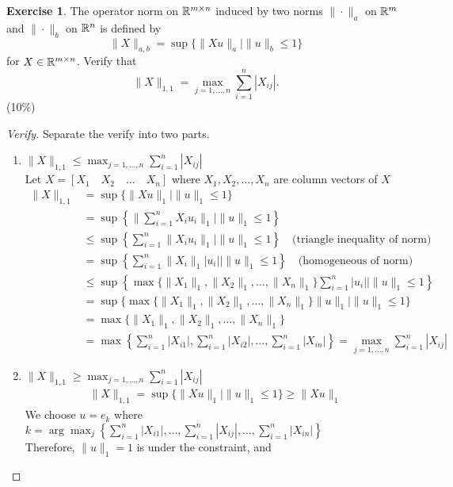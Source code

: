 \documentclass[12pt]{extarticle}
\theoremstyle{definition}
\newtheorem{exercise}{Exercise}
\begin{document}
\begin{exercise}
  The operator norm on $\mathbb{R}^{m\times n}$ induced by two norms $\|\cdot\|_a$ on $\mathbb{R}^m$ and $\|\cdot\|_b$ on $\mathbb{R}^n$ is defined by
  $$\|X\|_{a,b}=\sup\{\|Xu\|_a\mid\|u\|_b\le 1\}$$
  for $X\in\mathbb{R}^{m\times n}$. Verify that
  $$\|X\|_{1,1}=\max_{j=1,\dots,n}\sum_{i=1}^n|X_{ij}|.$$ (10\%)
\end{exercise}
\newpage
\begin{proof}[Verify]
  Separate the verify into two parts.
  \begin{enumerate}[label=(\alph*)]
    \item $\|X\|_{1,1}\le\max_{j=1,\dots,n}\sum_{i=1}^n|X_{ij}|$\\
      Let $X=[X_1\quad X_2\quad\dots\quad X_n]$ where $X_1,X_2,\dots,X_n$ are column vectors of $X$
      \begin{align*}
        \|X\|_{1,1} &=   \sup\{\|Xu\|_1\mid\|u\|_1\le 1\}\\
                    &=   \sup\left\{\|\sum_{i=1}^nX_iu_i\|_1\mid\|u\|_1\le 1\right\}\\
                    &\le \sup\left\{\sum_{i=1}^n\|X_iu_i\|_1\mid\|u\|_1\le 1\right\}\quad\text{(triangle inequality of norm)}\\
                    &=   \sup\left\{\sum_{i=1}^n\|X_i\|_1|u_i|\mid\|u\|_1\le 1\right\}\quad\text{(homogeneous of norm)}\\
                    &\le \sup\left\{\max\{\|X_1\|_1,\|X_2\|_1,\dots,\|X_n\|_1\}\sum_{i=1}^n|u_i|\mid\|u\|_1\le 1\right\}\\
                    &=   \sup\{\max\{\|X_1\|_1,\|X_2\|_1,\dots,\|X_n\|_1\}\|u\|_1\mid\|u\|_1\le 1\}\\
                    &=   \max\{\|X_1\|_1,\|X_2\|_1,\dots,\|X_n\|_1\}\\
                    &=   \max\left\{\sum_{i=1}^n|X_{i1}|,\sum_{i=1}^n|X_{i2}|,\dots,\sum_{i=1}^n|X_{in}|\right\} = \max_{j=1,\dots,n}\sum_{i=1}^n|X_{ij}|
      \end{align*}
    \item $\|X\|_{1,1}\ge\max_{j=1,\dots,n}\sum_{i=1}^n|X_{ij}|$
      \begin{align*}
        \|X\|_{1,1} = \sup\{\|Xu\|_1\mid\|u\|_1\le 1\} \ge \|Xu\|_1
      \end{align*}
      We choose $u=e_k$ where $k=\arg\max_j\left\{\sum_{i=1}^n|X_{i1}|,\dots,\sum_{i=1}^n|X_{ij}|,\dots,\sum_{i=1}^n|X_{in}|\right\}$\\
      Therefore, $\|u\|_1=1$ is under the constraint, and

\end{enumerate}
\end{proof}
\end{document}
